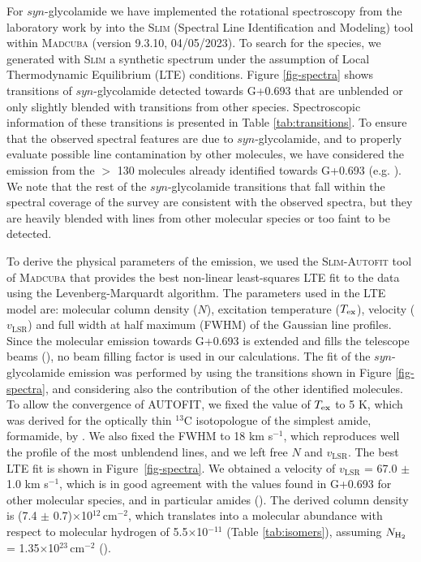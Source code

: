 \documentclass[twocolumn]{aastex63}
\begin{document}
For $syn$-glycolamide we have implemented the rotational spectroscopy from the laboratory work by \citet{sanz-novo2020} into the \textsc{Slim} (Spectral Line Identification and Modeling) tool within \textsc{Madcuba} (version 9.3.10, 04/05/2023). To search for the species, we generated with \textsc{Slim} a synthetic spectrum under the assumption of Local Thermodynamic Equilibrium (LTE) conditions. Figure \ref{fig-spectra} shows transitions of $syn$-glycolamide detected towards G+0.693 that are unblended or only slightly blended with transitions from other species. Spectroscopic information of these transitions is presented in Table \ref{tab:transitions}.
To ensure that the observed spectral features are due to $syn$-glycolamide, and to properly evaluate possible line contamination by other molecules, we have considered the emission from the $>$ 130 molecules already identified towards G+0.693 (e.g. \citealt{requena-torres_organic_2006,requena-torres_largest_2008,zeng2018,Rivilla2018,rivilla2019b,rivilla2020b,rivilla2021a,rivilla2021b,rivilla2022a,rivilla2022b,rivilla2022c,jimenez-serra2020,jimenez-serra2022,bizzocchi2020,rodriguez-almeida2021a,rodriguez-almeida2021b,zeng2021,colzi2022,alberton2023,sanandres2023,zeng2023}). 
We note that the rest of the $syn$-glycolamide transitions that fall within the spectral coverage of the survey are consistent with the observed spectra, but they are heavily blended with lines from other molecular species or too faint to be detected.

To derive the physical parameters of the emission, we used the \textsc{Slim-Autofit} tool of \textsc{Madcuba} that provides the best non-linear least-squares LTE fit to the data using the Levenberg-Marquardt algorithm. The parameters used in the LTE model are: molecular column density ($N$), excitation temperature ($T_{\rm ex}$), velocity ($v_\text{LSR}$) and full width at half maximum (FWHM) of the Gaussian line profiles. 
Since the molecular emission towards G+0.693 is extended and fills the telescope beams (\citealt{requena-torres_organic_2006,requena-torres_largest_2008,zeng2018,zeng2020}), no beam filling factor is used in our calculations.
%
The fit of the $syn$-glycolamide emission was performed by using the transitions shown in Figure \ref{fig-spectra}, and considering also the contribution of the other identified molecules. 
To allow the convergence of AUTOFIT, we fixed the value of  $T_{\rm ex}$ to 5 K, which was derived for the optically thin $^{13}$C isotopologue of the simplest amide, formamide, by \citet{zeng2023}. We also fixed the FWHM to 18 km s$^{-1}$, which reproduces well the profile of the most unblendend lines, and we left free $N$ and $v_\text{LSR}$. 
The best LTE fit is shown in Figure~\ref{fig-spectra}. 
We obtained a velocity of $v_\text{LSR}$ = 67.0 $\pm$ 1.0 km s$^{-1}$, which is in good agreement with the values found in G+0.693 for other molecular species, and in particular amides (\citealt{zeng2023}). The derived column density is (7.4 $\pm$ 0.7)$\times$10$^{12}$\,cm$^{-2}$, which translates into a molecular abundance with respect to molecular hydrogen of 5.5$\times$10$^{-11}$ (Table \ref{tab:isomers}), assuming $N_{\rm H_2}$ = 1.35$\times$10$^{23}$\,cm$^{-2}$ (\citealt{martin_tracing_2008}).
\end{document}

